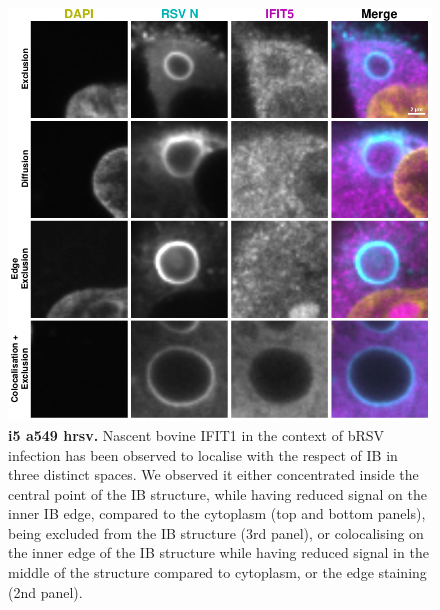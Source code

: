 \begin{figure}
    \centering
    \includegraphics[width=1\linewidth]{09. Chapter 4/Figs/02. Infection/03. IFIT5/03. a549 i5.pdf}
    \caption[i5 a549 hrsv]{\textbf{i5 a549 hrsv.} Nascent bovine IFIT1 in the context of bRSV infection has been observed to localise with the respect of IB in three distinct spaces. We observed it either concentrated inside the central point of the IB structure, while having reduced signal on the inner IB edge, compared to the cytoplasm (top and bottom panels), being excluded from the IB structure (3rd panel), or colocalising on the inner edge of the IB structure while having reduced signal in the middle of the structure compared to cytoplasm, or the edge staining (2nd panel).}
    \label{fig:i5 a549 hrsv}
\end{figure}

